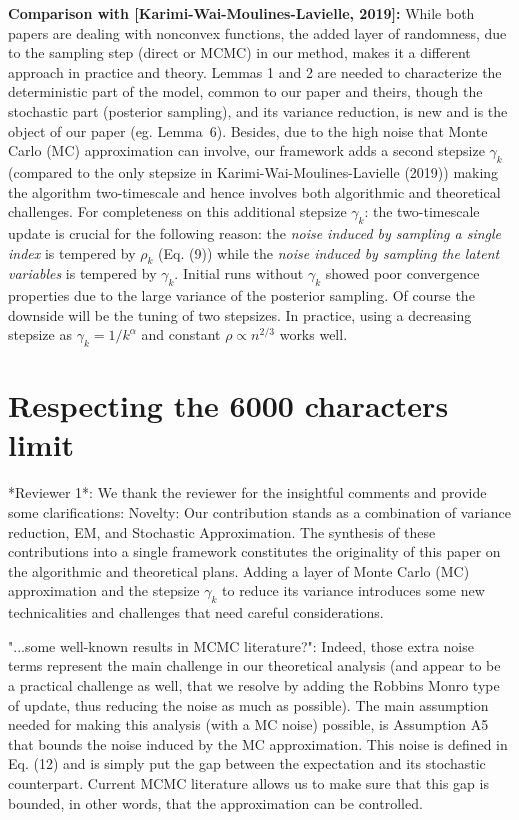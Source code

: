 \documentclass[anon,12pt]{alt2021} %
\begin{document}
\textbf{Comparison with [Karimi-Wai-Moulines-Lavielle, 2019]:} 
While both papers are dealing with nonconvex functions, the added layer of randomness, due to the sampling step (direct or MCMC) in our method, makes it a different approach in practice and theory.
Lemmas 1 and 2 are needed to characterize the deterministic part of the model, common to our paper and theirs, though the stochastic part (posterior sampling), and its variance reduction, is new and is the object of our paper (eg. Lemma~6).
Besides, due to the high noise that Monte Carlo (MC) approximation can involve, our framework adds a second stepsize $\gamma_k$ (compared to the only stepsize in Karimi-Wai-Moulines-Lavielle (2019)) making the algorithm two-timescale and hence involves both algorithmic and theoretical challenges. 
For completeness on this additional stepsize  $\gamma_k$: the two-timescale update is crucial for the following reason: the \emph{noise induced by sampling a single index} is tempered by $\rho_k$ (Eq. (9)) while the \emph{noise induced by sampling the latent variables} is tempered by $\gamma_k$. 
Initial runs without $\gamma_k$ showed poor convergence properties due to the large variance of the posterior sampling.
Of course the downside will be the tuning of two stepsizes. 
In practice, using a decreasing stepsize as $\gamma_k = 1/k^{\alpha}$ and constant $\rho \propto n^{2/3}$ works well.



\section{Respecting the 6000 characters limit}

*Reviewer 1*: 
We thank the reviewer for the insightful comments and provide some clarifications:
Novelty: Our contribution stands as a combination of variance reduction, EM, and Stochastic Approximation. 
The synthesis of these contributions into a single framework constitutes the originality of this paper on the algorithmic and theoretical plans.
Adding a layer of Monte Carlo (MC) approximation and the stepsize $\gamma_k$ to reduce its variance introduces some new technicalities and challenges that need careful considerations.

"...some well-known results in MCMC literature?": Indeed, those extra noise terms represent the main challenge in our theoretical analysis (and appear to be a practical challenge as well, that we resolve by adding the Robbins Monro type of update, thus reducing the noise as much as possible). The main assumption needed for making this analysis (with a MC noise) possible, is Assumption A5 that bounds the noise induced by the MC approximation. This noise is defined in Eq. (12) and is simply put the gap between the expectation and its stochastic counterpart. Current MCMC literature allows us to make sure that this gap is bounded, in other words, that the approximation can be controlled.
\end{document}
